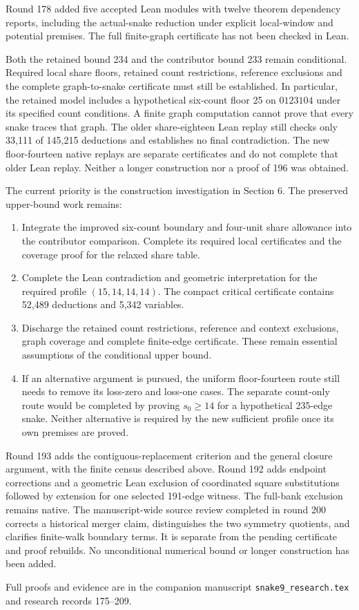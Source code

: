 \documentclass[11pt,a4paper]{article}
\begin{document}
Round 178 added five accepted Lean modules with twelve theorem dependency
reports, including the actual-snake reduction under explicit local-window
and potential premises. The full finite-graph certificate has not been
checked in Lean.

Both the retained bound 234 and the contributor bound 233 remain conditional. Required local share
floors, retained count restrictions, reference exclusions and the complete
graph-to-snake certificate must still be established. In particular, the
retained model includes a hypothetical six-count floor 25 on $0123104$
under its specified count conditions. A finite graph computation cannot
prove that every snake traces that graph. The older share-eighteen Lean replay
still checks only 33,111 of 145,215 deductions and establishes no final
contradiction. The new floor-fourteen native replays are separate
certificates and do not complete that older Lean replay. Neither a longer construction nor a proof of 196 was obtained.

The current priority is the construction investigation in Section 6.
The preserved upper-bound work remains:
\begin{enumerate}
\item Integrate the improved six-count boundary and four-unit share allowance
into the contributor comparison. Complete its required local certificates
and the coverage proof for the relaxed share table.
\item Complete the Lean contradiction and geometric interpretation for
the required profile $(15,14,14,14)$. The compact critical certificate
contains 52,489 deductions and 5,342 variables.
\item Discharge the retained count restrictions, reference and context
exclusions, graph coverage and complete finite-edge certificate. These
remain essential assumptions of the conditional upper bound.
\item If an alternative argument is pursued, the uniform floor-fourteen
route still needs to remove its loss-zero and loss-one cases. The separate
count-only route would be completed by proving $s_0\ge14$ for a hypothetical
235-edge snake. Neither alternative is required by the new sufficient
profile once its own premises are proved.
\end{enumerate}
Round 193 adds the contiguous-replacement criterion and the general closure argument, with the finite census described above. Round 192 adds endpoint corrections and a geometric Lean exclusion of
coordinated square substitutions followed by extension for one selected
191-edge witness. The full-bank exclusion remains native. The manuscript-wide source review
completed in round 200 corrects a historical merger claim, distinguishes
the two symmetry quotients, and clarifies finite-walk boundary terms.
It is separate from the pending certificate and proof rebuilds.
No unconditional numerical bound or longer construction has been added.

\smallskip
{\small Full proofs and evidence are in the companion manuscript
\texttt{snake9\_research.tex} and research records 175--209.}
\end{document}
